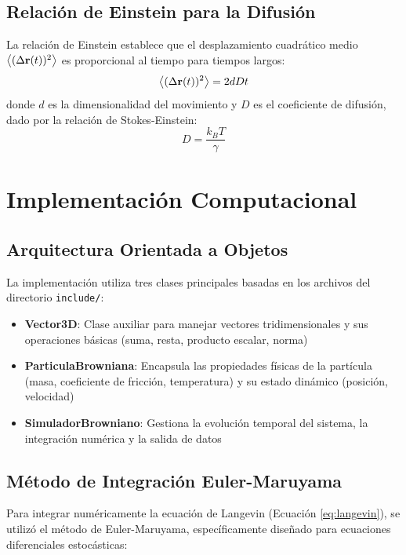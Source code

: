 \documentclass[11pt,a4paper]{article}
\begin{document}
\subsection{Relación de Einstein para la Difusión}
La relación de Einstein establece que el desplazamiento cuadrático medio $\expval{(\Delta\vb{r}(t))^2}$ es proporcional al tiempo para tiempos largos:
\begin{equation}
    \expval{(\Delta\vb{r}(t))^2} = 2dDt
    \label{eq:difusion_einstein}
\end{equation}
donde $d$ es la dimensionalidad del movimiento y $D$ es el coeficiente de difusión, dado por la relación de Stokes-Einstein:
\begin{equation}
    D = \frac{k_B T}{\gamma}
    \label{eq:stokes_einstein}
\end{equation}

\section{Implementación Computacional}

\subsection{Arquitectura Orientada a Objetos}
La implementación utiliza tres clases principales basadas en los archivos del directorio \texttt{include/}:

\begin{itemize}
    \item \textbf{Vector3D}: Clase auxiliar para manejar vectores tridimensionales y sus operaciones básicas (suma, resta, producto escalar, norma)
    \item \textbf{ParticulaBrowniana}: Encapsula las propiedades físicas de la partícula (masa, coeficiente de fricción, temperatura) y su estado dinámico (posición, velocidad)
    \item \textbf{SimuladorBrowniano}: Gestiona la evolución temporal del sistema, la integración numérica y la salida de datos
\end{itemize}

\subsection{Método de Integración Euler-Maruyama}
Para integrar numéricamente la ecuación de Langevin (Ecuación \ref{eq:langevin}), se utilizó el método de Euler-Maruyama, específicamente diseñado para ecuaciones diferenciales estocásticas:
\end{document}
